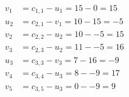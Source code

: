 \[
\begin{aligned}
v_{1} &= c_{1,1} - u_{1} = 15 - 0 = 15 \\
u_{2} &= c_{2,1} - v_{1} = 10 - 15 = -5 \\
v_{2} &= c_{2,2} - u_{2} = 10 - -5 = 15 \\
v_{3} &= c_{2,3} - u_{2} = 11 - -5 = 16 \\
u_{3} &= c_{3,3} - v_{3} = 7 - 16 = -9 \\
v_{4} &= c_{3,4} - u_{3} = 8 - -9 = 17 \\
v_{5} &= c_{3,5} - u_{3} = 0 - -9 = 9 \\
\end{aligned}
\]

